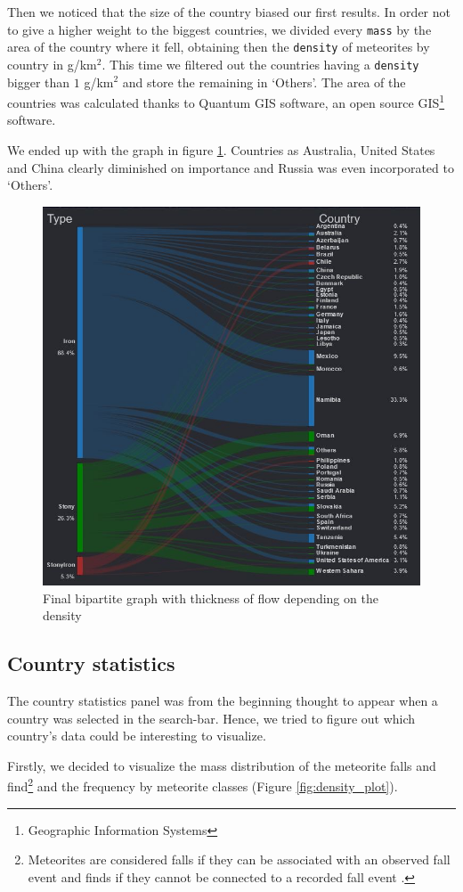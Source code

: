 \documentclass[10pt,conference,compsocconf]{IEEEtran}
\begin{document}
Then we noticed that the size of the country biased our first results. In order not to give a higher weight to the biggest countries, we divided every \texttt{mass} by the area of the country where it fell, obtaining then the \texttt{density} of meteorites by country in g/km$^2$. This time we filtered out the countries having a \texttt{density} bigger than $1$ g/km$^2$ and store the remaining in `Others'. The area of the countries was calculated thanks to Quantum GIS software, an open source GIS\footnote{Geographic Information Systems} software. 

We ended up with the graph in figure \ref{fig:bipartite_density}. Countries as Australia, United States and China clearly diminished on importance and Russia was even incorporated to `Others'.

\begin{figure}[]
  \centering
  \includegraphics[width=0.7\columnwidth]{images/bipartite_density}
  \vspace{3mm}
  \caption{Final bipartite graph with thickness of flow depending on the density}
  \label{fig:bipartite_density}
\end{figure}

\subsection{Country statistics}
The country statistics panel was from the beginning thought to appear when a country was selected in the search-bar. Hence, we tried to figure out which country's data  could be interesting to visualize. 

Firstly, we decided to visualize the mass distribution of the meteorite falls and find\footnote{Meteorites are considered falls if they can be associated with an observed fall event and finds if they
cannot be connected to a recorded fall event \cite{weisberg_systematics_2006}.} and the frequency by meteorite classes (Figure \ref{fig:density_plot}).
\end{document}
